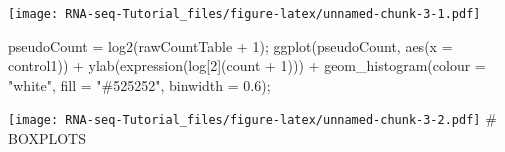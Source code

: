 \documentclass[
]{article}
\newenvironment{Shaded}{\begin{snugshade}}{\end{snugshade}}
\newcommand{\AttributeTok}[1]{\textcolor[rgb]{0.77,0.63,0.00}{#1}}
\newcommand{\CommentTok}[1]{\textcolor[rgb]{0.56,0.35,0.01}{\textit{#1}}}
\newcommand{\DecValTok}[1]{\textcolor[rgb]{0.00,0.00,0.81}{#1}}
\newcommand{\FloatTok}[1]{\textcolor[rgb]{0.00,0.00,0.81}{#1}}
\newcommand{\FunctionTok}[1]{\textcolor[rgb]{0.00,0.00,0.00}{#1}}
\newcommand{\NormalTok}[1]{#1}
\newcommand{\OtherTok}[1]{\textcolor[rgb]{0.56,0.35,0.01}{#1}}
\newcommand{\SpecialCharTok}[1]{\textcolor[rgb]{0.00,0.00,0.00}{#1}}
\newcommand{\StringTok}[1]{\textcolor[rgb]{0.31,0.60,0.02}{#1}}
\begin{document}
\texttt{[image: RNA-seq-Tutorial\_files/figure-latex/unnamed-chunk-3-1.pdf]}

\begin{Shaded}
\begin{Highlighting}[]
\NormalTok{pseudoCount }\OtherTok{=} \FunctionTok{log2}\NormalTok{(rawCountTable }\SpecialCharTok{+} \DecValTok{1}\NormalTok{);}
\FunctionTok{ggplot}\NormalTok{(pseudoCount, }\FunctionTok{aes}\NormalTok{(}\AttributeTok{x =}\NormalTok{ control1)) }\SpecialCharTok{+} \FunctionTok{ylab}\NormalTok{(}\FunctionTok{expression}\NormalTok{(log[}\DecValTok{2}\NormalTok{](count }\SpecialCharTok{+} \DecValTok{1}\NormalTok{))) }\SpecialCharTok{+}
\FunctionTok{geom\_histogram}\NormalTok{(}\AttributeTok{colour =} \StringTok{"white"}\NormalTok{, }\AttributeTok{fill =} \StringTok{"\#525252"}\NormalTok{, }\AttributeTok{binwidth =} \FloatTok{0.6}\NormalTok{);}
\end{Highlighting}
\end{Shaded}

\texttt{[image: RNA-seq-Tutorial\_files/figure-latex/unnamed-chunk-3-2.pdf]}
\# BOXPLOTS

\begin{Shaded}
\end{Shaded}
\end{document}

